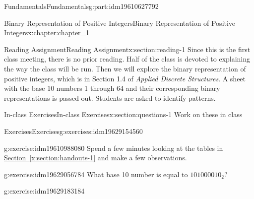 \documentclass[oneside,10pt,]{book}
\newcommand{\xreffont}{\relax}
\numberwithin{equation}{section}
\begin{document}
\begin{partptx}{Fundamentals}{}{Fundamentals}{}{}{g:part:idm19610627792}
%
\typeout{************************************************}
\typeout{************************************************}
%
\begin{chapterptx}{Binary Representation of Positive Integers}{}{Binary Representation of Positive Integers}{}{}{x:chapter:chapter_1}
%
%
%
\typeout{************************************************}
\typeout{************************************************}
%
\begin{sectionptx}{Reading Assignment}{}{Reading Assignment}{}{}{x:section:reading-1}
Since this is the first class meeting, there is no prior reading.  Half of the class is devoted to explaining the way the class will be run.  Then we will explore the binary representation of positive integers, which is in Section 1.4 of \emph{Applied Discrete Structures}.  A sheet with the base 10 numbers 1 through 64 and their corresponding binary representations is passed out.  Students are asked to identify patterns.%
\end{sectionptx}
%
%
\typeout{************************************************}
\typeout{************************************************}
%
\begin{sectionptx}{In-class Exercises}{}{In-class Exercises}{}{}{x:section:questions-1}
Work on these in class%
%
%
\typeout{************************************************}
\typeout{************************************************}
%
\begin{exercises-subsection-numberless}{Exercises}{}{Exercises}{}{}{g:exercises:idm19629154560}
\par\medskip\noindent%
%
\begin{exercisegroup}
\begin{divisionexerciseeg}{1}{}{}{g:exercise:idm19610988080}%
Spend a few minutes looking at the tables in \hyperref[x:section:handouts-1]{Section~{\xreffont\ref{x:section:handouts-1}}} and make a few observations.%
\end{divisionexerciseeg}%
\begin{divisionexerciseeg}{2}{}{}{g:exercise:idm19629056784}%
What base 10 number is equal to \(101000010_2\)?%
\end{divisionexerciseeg}%
\begin{divisionexerciseeg}{3}{}{}{g:exercise:idm19629183184}%

\end{divisionexerciseeg}
\end{exercisegroup}
\end{exercises-subsection-numberless}
\end{sectionptx}
\end{chapterptx}
\end{partptx}
\end{document}
